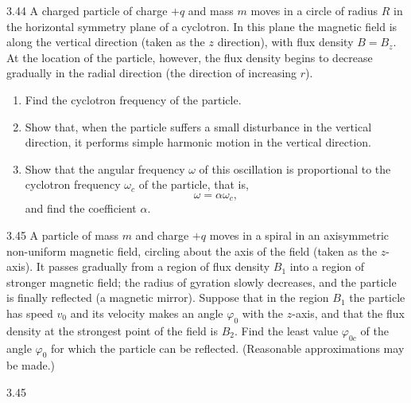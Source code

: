 \begin{problem}{3.44}
A charged particle of charge $+q$ and mass $m$ moves in a circle of radius $R$ in the horizontal symmetry plane of a cyclotron. In this plane the magnetic field is along the vertical direction (taken as the $z$ direction), with flux density $B=B_z$. At the location of the particle, however, the flux density begins to decrease gradually in the radial direction (the direction of increasing $r$).
\begin{enumerate}[label=(\arabic*),leftmargin=2.2em,itemsep=1pt,topsep=2pt]
\item Find the cyclotron frequency of the particle.
\item Show that, when the particle suffers a small disturbance in the vertical direction, it performs simple harmonic motion in the vertical direction.
\item Show that the angular frequency $\omega$ of this oscillation is proportional to the cyclotron frequency $\omega_c$ of the particle, that is,
\begin{equation*}
\omega=\alpha\omega_c,
\end{equation*}
and find the coefficient $\alpha$.
\end{enumerate}
\end{problem}

\begin{problem}{3.45}
A particle of mass $m$ and charge $+q$ moves in a spiral in an axisymmetric non-uniform magnetic field, circling about the axis of the field (taken as the $z$-axis). It passes gradually from a region of flux density $B_1$ into a region of stronger magnetic field; the radius of gyration slowly decreases, and the particle is finally reflected (a magnetic mirror). Suppose that in the region $B_1$ the particle has speed $v_0$ and its velocity makes an angle $\varphi_0$ with the $z$-axis, and that the flux density at the strongest point of the field is $B_2$. Find the least value $\varphi_{0c}$ of the angle $\varphi_0$ for which the particle can be reflected. (Reasonable approximations may be made.)
\end{problem}

\begin{figbox}{3.45}
\end{figbox}

